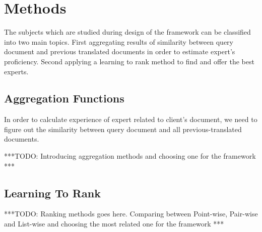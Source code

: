 \section{Methods}
\label{sec:methods}
The subjects which are studied during design of the framework can be classified into two main topics. First aggregating results of similarity between query document and previous translated documents in order to estimate expert's proficiency. Second applying a learning to rank method to find and offer the best experts.

\subsection{Aggregation Functions}
In order to calculate experience of expert related to client's document, we need to figure out the similarity between query document and all previous-translated documents. 

***TODO: Introducing aggregation methods and choosing one for the framework ***


\subsection{Learning To Rank}
***TODO: Ranking methods goes here. Comparing between Point-wise, Pair-wise and List-wise and choosing the most related one for the framework ***